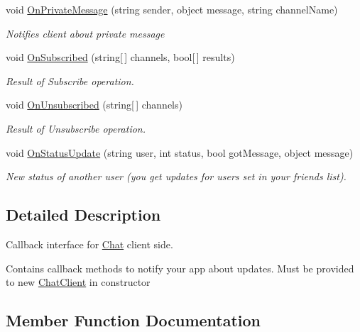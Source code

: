 \begin{DoxyCompactItemize}
void \hyperlink{interface_exit_games_1_1_client_1_1_photon_1_1_chat_1_1_i_chat_client_listener_a40b8c46d27d74b519f0fa34abd6fb81a}{On\+Private\+Message} (string sender, object message, string channel\+Name)
\begin{DoxyCompactList}\small\item\em Notifies client about private message \end{DoxyCompactList}\item 
void \hyperlink{interface_exit_games_1_1_client_1_1_photon_1_1_chat_1_1_i_chat_client_listener_a4dae08c2527025369671d13d8d67853e}{On\+Subscribed} (string\mbox{[}$\,$\mbox{]} channels, bool\mbox{[}$\,$\mbox{]} results)
\begin{DoxyCompactList}\small\item\em Result of Subscribe operation. \end{DoxyCompactList}\item 
void \hyperlink{interface_exit_games_1_1_client_1_1_photon_1_1_chat_1_1_i_chat_client_listener_a9e1b1dd69f646b62d2958f9c49db2630}{On\+Unsubscribed} (string\mbox{[}$\,$\mbox{]} channels)
\begin{DoxyCompactList}\small\item\em Result of Unsubscribe operation. \end{DoxyCompactList}\item 
void \hyperlink{interface_exit_games_1_1_client_1_1_photon_1_1_chat_1_1_i_chat_client_listener_aa2165bd3e01be72b48d2cd1f7b7a94e9}{On\+Status\+Update} (string user, int status, bool got\+Message, object message)
\begin{DoxyCompactList}\small\item\em New status of another user (you get updates for users set in your friends list). \end{DoxyCompactList}\end{DoxyCompactItemize}


\subsection{Detailed Description}
Callback interface for \hyperlink{namespace_exit_games_1_1_client_1_1_photon_1_1_chat}{Chat} client side. 

Contains callback methods to notify your app about updates. Must be provided to new \hyperlink{class_exit_games_1_1_client_1_1_photon_1_1_chat_1_1_chat_client}{Chat\+Client} in constructor 

\subsection{Member Function Documentation}
